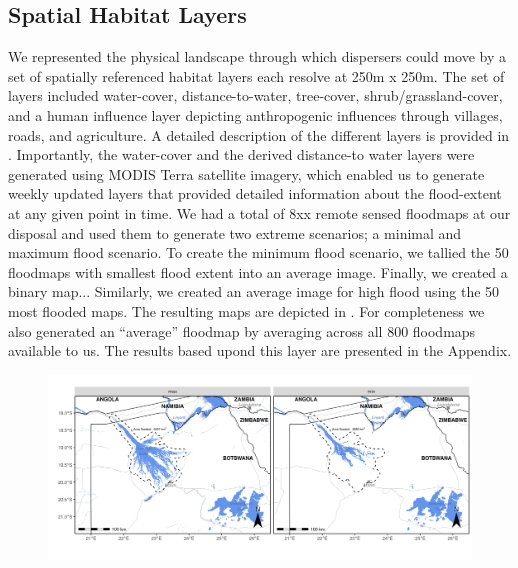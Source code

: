 \documentclass[abstract=on,10pt,a4paper,bibliography=totocnumbered]{article}
\begin{document}
\subsection{Spatial Habitat Layers}
We represented the physical landscape through which dispersers could move by a
set of spatially referenced habitat layers each resolve at 250m x 250m. The set
of layers included water-cover, distance-to-water, tree-cover,
shrub/grassland-cover, and a human influence layer depicting anthropogenic
influences through villages, roads, and agriculture. A detailed description of
the different layers is provided in . Importantly, the
water-cover and the derived distance-to water layers were generated using MODIS
Terra satellite imagery, which enabled us to generate weekly updated layers that
provided detailed information about the flood-extent at any given point in time.
We had a total of 8xx remote sensed floodmaps at our disposal and used them to
generate two extreme scenarios; a minimal and maximum flood scenario. To create
the minimum flood scenario, we tallied the 50 floodmaps with smallest flood
extent into an average image. Finally, we created a binary map... Similarly, we
created an average image for high flood using the 50 most flooded maps. The
resulting maps are depicted in . For completeness we also
generated an  ``average'' floodmap by averaging across all 800 floodmaps
available to us. The results based upond this layer are presented in the
Appendix.

\begin{figure}
  \begin{center}
  \includegraphics[width = \textwidth]{99_FloodExtent.png}
  \caption{}
  \label{FloodExtent}
  \end{center}
\end{figure}
\end{document}
